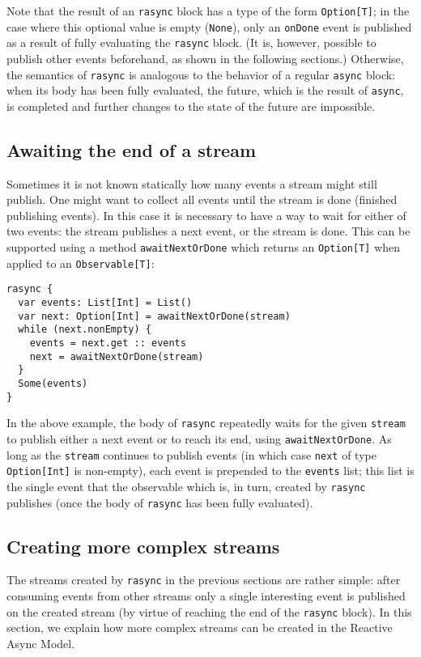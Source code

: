 \documentclass{acm_proc_article-sp}
\begin{document}
Note that the result of an \verb|rasync| block has a type of the form
\verb|Option[T]|; in the case where this optional value is empty
(\verb|None|), only an \verb|onDone| event is published as a result of fully
evaluating the \verb|rasync| block. (It is, however, possible to publish other
events beforehand, as shown in the following sections.) Otherwise, the
semantics of \verb|rasync| is analogous to the behavior of a regular
\verb|async| block: when its body has been fully evaluated, the future, which
is the result of \verb|async|, is completed and further changes to the state
of the future are impossible.


\subsection{Awaiting the end of a stream}

Sometimes it is not known statically how many events a stream might still
publish. One might want to collect all events until the stream is done
(finished publishing events). In this case it is necessary to have a way to
wait for either of two events: the stream publishes a next event, or the
stream is done. This can be supported using a method \verb|awaitNextOrDone|
which returns an \verb|Option[T]| when applied to an \verb|Observable[T]|:

\begin{lstlisting}
rasync {
  var events: List[Int] = List()
  var next: Option[Int] = awaitNextOrDone(stream)
  while (next.nonEmpty) {
    events = next.get :: events
    next = awaitNextOrDone(stream)
  }
  Some(events)
}
\end{lstlisting}

In the above example, the body of \verb|rasync| repeatedly waits for the given
\verb|stream| to publish either a next event or to reach its end, using
\verb|awaitNextOrDone|. As long as the \verb|stream| continues to publish
events (in which case \verb|next| of type \verb|Option[Int]| is non-empty),
each event is prepended to the \verb|events| list; this list is the single
event that the observable which is, in turn, created by \verb|rasync|
publishes (once the body of \verb|rasync| has been fully evaluated).


\subsection{Creating more complex streams}

The streams created by \verb|rasync| in the previous sections are rather
simple: after consuming events from other streams only a single interesting
event is published on the created stream (by virtue of reaching the end of the
\verb|rasync| block). In this section, we explain how more complex streams can
be created in the Reactive Async Model.
\end{document}
